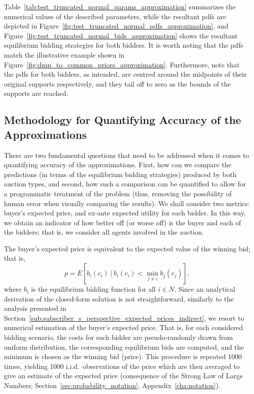 Table~\ref{tab:test_truncated_normal_params_approximation} summarizes the numerical values of the described parameters, while the resultant pdfs are depicted in Figure~\ref{fig:test_truncated_normal_pdfs_approximation}, and Figure~\ref{fig:test_truncated_normal_bids_approximation} shows the resultant equilibrium bidding strategies for both bidders. It is worth noting that the pdfs match the illustrative example shown in Figure~\ref{fig:dmp_to_common_priors_approximation}. Furthermore, note that the pdfs for both bidders, as intended, are centred around the midpoints of their original supports respectively, and they tail off to zero as the bounds of the supports are reached.

\subsection{Methodology for Quantifying Accuracy of the Approximations} %
\label{sub:methodology_for_quantifying_accuracy_of_the_approximations_approximation}
There are two fundamental questions that need to be addressed when it comes to quantifying accuracy of the approximations. First, how can we compare the predictions (in terms of the equilibrium bidding strategies) produced by both auction types, and second, how such a comparison can be quantified to allow for a programmatic treatment of the problem (thus, removing the possibility of human error when visually comparing the results). We shall consider two metrics: buyer's expected price, and ex-ante expected utility for each bidder. In this way, we obtain an indicator of how better off (or worse off) is the buyer and each of the bidders; that is, we consider all agents involved in the auction.

The buyer's expected price is equivalent to the expected value of the winning bid; that is,
\begin{equation}
  \label{eq:expected_price_approximation}
  p = E[b_i(c_i) \:\vert\: b_i(c_i) < \min_{j\neq i} b_j(c_j)],
\end{equation}
where $b_i$ is the equilibrium bidding function for all $i\in N$. Since an analytical derivation of the closed-form solution is not straightforward, similarly to the analysis presented in Section~\ref{sub:subscriber_s_perspective_expected_prices_indirect}, we resort to numerical estimation of the buyer's expected price. That is, for each considered bidding scenario, the costs for each bidder are pseudo-randomly drawn from uniform distribution, the corresponding equilibrium bids are computed, and the minimum is chosen as the winning bid (price). This procedure is repeated 1000 times, yielding 1000 i.i.d.~observations of the price which are then averaged to give an estimate of the expected price (consequence of the Strong Law of Large Numbers; Section~\ref{sec:probability_notation}, Appendix~\ref{cha:notation}).

